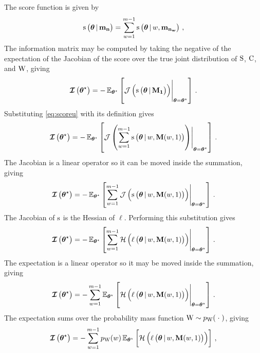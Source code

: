 \documentclass[
    11pt,
    extrafontsizes,
    article,
    oldfontcommands,
    final,
    oneside,
    openany,
    hidelinks]{memoir}
\begin{document}
The score function is given by
\begin{equation}
\label{eq:scoreu}
    \operatorname{\rm{s}}\left(\boldsymbol{\mathbf{\theta}} {\,|\,} \boldsymbol{\mathbf{m_n}}\right) = \sum_{w=1}^{m-1} \operatorname{\rm{s}}\left(\boldsymbol{\mathbf{\theta}} {\,|\,} w, \boldsymbol{\mathbf{m_{n_w}}}\right)\,,
\end{equation}
The information matrix may be computed by taking the negative of the expectation of the Jacobian of the score over the true joint distribution of $\mathrm{S}$, $\mathrm{C}$, and $\mathrm{W}$, giving
\begin{equation}
    \infomatrx\left(\tparam\sysparamvec\right) = -\expectation_{\tparam\sysparamvec}\left[\eval{\jacobian\left(\score\left(\sysparamvec \given \mfsn{1}\right)\right)}_{\sysparamvec=\tparam\sysparamvec}\right]\,.
\end{equation}
Substituting \cref{eq:scoreu} with its definition gives
\begin{equation}
    \infomatrx\left(\tparam\sysparamvec\right) = -\expectation_{\tparam\sysparamvec}\left[\eval{\jacobian\left(\sum_{w=1}^{m-1} \score\left(\sysparamvec \given w, \mfsi{1}\right)\right)}_{\sysparamvec = \tparam\sysparamvec}\right]\,.
\end{equation}
The Jacobian is a linear operator so it can be moved inside the summation, giving
\begin{equation}
    \infomatrx\left(\tparam\sysparamvec\right) = 
    -\expectation_{\tparam\sysparamvec}\left[\sum_{w=1}^{m-1} \eval{\jacobian\left(\score\left(\sysparamvec \given w, \mfsi{1}\right)\right)}_{\sysparamvec=\tparam\sysparamvec}\right]\,.
\end{equation}
The Jacobian of $\operatorname{\rm{s}}$ is the Hessian of $\ell$. Performing this substitution gives
\begin{equation}
    \infomatrx\left(\tparam\sysparamvec\right) = -\expectation_{\tparam\sysparamvec}\left[\sum_{w=1}^{m-1} \eval{\hessian\left(\ell\left(\sysparamvec \given w, \mfsi{1}\right)\right)}_{\sysparamvec=\tparam\sysparamvec}\right]\,.
\end{equation}
The expectation is a linear operator so it may be moved inside the summation, giving
\begin{equation}
    \infomatrx\left(\tparam\sysparamvec\right) = -\sum_{w=1}^{m-1} \expectation_{\tparam\sysparamvec}\left[\eval{\hessian\left(\ell\left(\sysparamvec \given w, \mfsi{1}\right)\right)}_{\sysparamvec=\tparam\sysparamvec}\right]\,.
\end{equation}
The expectation sums over the probability mass function $\mathrm{W} \sim p_{\mathrm{W}}(\;\cdot\;)$, giving
\begin{equation}
    \operatorname{\boldsymbol{\mathcal{I}}}\left({\boldsymbol{\mathbf{\theta}}}^{\star}\right)
        = -\sum_{w=1}^{m-1} p_{\mathrm{W}}(w) \operatorname{\mathbb{E}}_{{\boldsymbol{\mathbf{\theta}}}^{\star}}\left[\operatorname{\mathcal{H}}\left(\ell\left(\boldsymbol{\mathbf{\theta}} {\,|\,} w, \boldsymbol{\mathbf{M}}(w,{1})\right)\right)\right]\,,
\end{equation}
\end{document}

